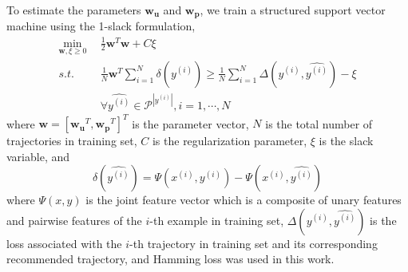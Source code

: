 
To estimate the parameters $\mathbf{w_u}$ and $\mathbf{w_p}$, we train a structured support vector machine
using the 1-slack formulation\cite{ssvm09},
\begin{align*}
    \min_{\mathbf{w}, \xi \ge 0} ~~& \frac{1}{2} \mathbf{w}^T \mathbf{w} + C \xi \\
    s.t. ~~& \frac{1}{N} \mathbf{w}^T \sum_{i=1}^N \delta(\hat{y^{(i)}}) \ge
                  \frac{1}{N} \sum_{i=1}^N \Delta(y^{(i)}, \hat{y^{(i)}}) - \xi \\
         ~~& \forall \hat{y^{(i)}} \in \mathcal{P}^{|y^{(i)}|}, i = 1, \cdots, N
\end{align*}
where $\mathbf{w} = [\mathbf{w_u}^T, \mathbf{w_p}^T]^T$ is the parameter vector,
$N$ is the total number of trajectories in training set, $C$ is the regularization parameter,
$\xi$ is the slack variable, and
\begin{displaymath}
    \delta(\hat{y^{(i)}}) = \Psi(x^{(i)}, y^{(i)}) - \Psi(x^{(i)}, \hat{y^{(i)}})
\end{displaymath}
where $\Psi(x, y)$ is the joint feature vector which is a composite of unary features and pairwise features of the
$i$-th example in training set,
$\Delta(y^{(i)}, \hat{y^{(i)}})$ is the loss associated with the $i$-th trajectory in training set and
its corresponding recommended trajectory, and Hamming loss was used in this work.

